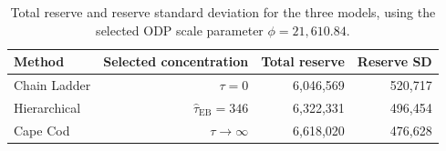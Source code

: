 \begin{table}[htbp]
\centering
\begin{tabular}{lrrr}
\toprule
Method & Selected concentration & Total reserve & Reserve SD \\
\midrule
Chain Ladder & $\tau=0$ & 6,046,569 & 520,717 \\
Hierarchical & $\widehat{\tau}_{\mathrm{EB}}=346$ & 6,322,331 & 496,454 \\
Cape Cod & $\tau\to \infty$ & 6,618,020 & 476,628 \\
\bottomrule
\end{tabular}
\caption{Total reserve and reserve standard deviation for the three models, using the selected ODP scale parameter $\phi=21,610.84$.}
\label{tab:saluz_totals}
\end{table}